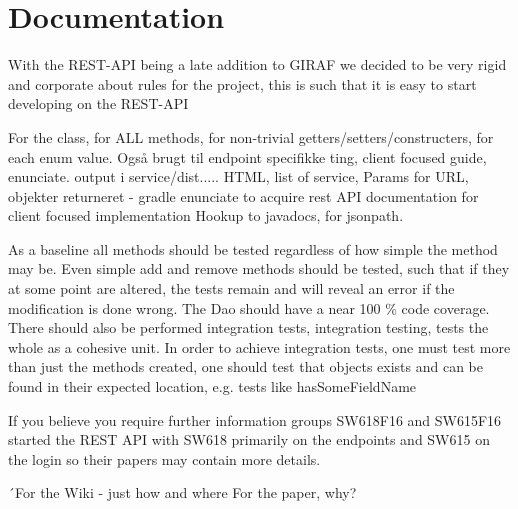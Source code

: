 \section{Documentation}
With the REST-API being a late addition to GIRAF we decided to be very rigid and corporate about rules for the project, this is such that it is easy to start developing on the REST-API

For the class, for ALL methods, for non-trivial getters/setters/constructers, for each enum value.
Også brugt til endpoint specifikke ting, client focused guide, enunciate.
output i service/dist..... HTML, list of service, Params for URL, objekter returneret -  gradle enunciate to acquire rest API documentation for client focused implementation
Hookup to javadocs, for jsonpath.

As a baseline all methods should be tested regardless of how simple the method may be.
Even simple add and remove methods should be tested, such that if they at some point are altered, the tests remain and will reveal an error if the modification is done wrong.
The Dao should have a near 100 \% code coverage.
There should also be performed integration tests, integration testing, tests the whole as a cohesive unit.
In order to achieve integration tests, one must test more than just the methods created, one should test that objects exists and can be found in their expected location, e.g. tests like hasSomeFieldName


If you believe you require further information groups SW618F16 and SW615F16 started the REST API with SW618 primarily on the endpoints and SW615 on the login so their papers may contain more details.

´For the Wiki - just how and where
For the paper, why?